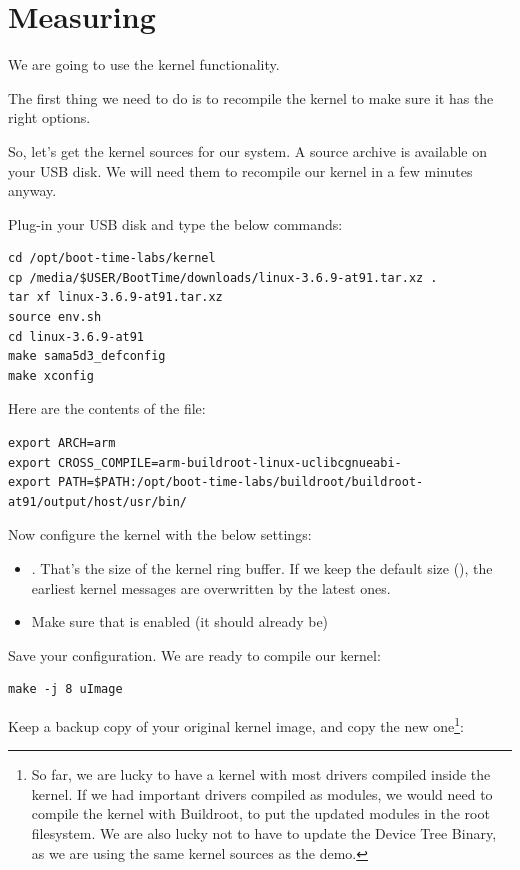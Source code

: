 
\section{Measuring}

We are going to use the kernel  functionality.

The first thing we need to do is to recompile the kernel to make sure
it has the right options.

So, let's get the kernel sources for our system. A source archive
is available on your USB disk. We will need
them to recompile our kernel in a few minutes anyway.

Plug-in your USB disk and type the below commands:

\begin{verbatim}
cd /opt/boot-time-labs/kernel
cp /media/$USER/BootTime/downloads/linux-3.6.9-at91.tar.xz .
tar xf linux-3.6.9-at91.tar.xz
source env.sh
cd linux-3.6.9-at91
make sama5d3_defconfig
make xconfig
\end{verbatim}

Here are the contents of the  file:

\begin{verbatim}
export ARCH=arm
export CROSS_COMPILE=arm-buildroot-linux-uclibcgnueabi-
export PATH=$PATH:/opt/boot-time-labs/buildroot/buildroot-at91/output/host/usr/bin/
\end{verbatim}

Now configure the kernel with the below settings:
\begin{itemize}
\item {}. That's the size of the
      kernel ring buffer. If we keep the default size (),
      the earliest kernel messages are overwritten by the
      latest ones.
\item Make sure that  is enabled
      (it should already be)
\end{itemize}

Save your configuration. We are ready to compile our kernel:
\begin{verbatim}
make -j 8 uImage
\end{verbatim}

Keep a backup copy of your original kernel image, and copy the new
one\footnote{So far, we are lucky to have a kernel with most drivers
compiled inside the kernel. If we had important drivers compiled
as modules, we would need to compile the kernel with Buildroot,
to put the updated modules in the root filesystem. We are also lucky
not to have to update the Device Tree Binary, as we are using
the same kernel sources as the demo.}:

